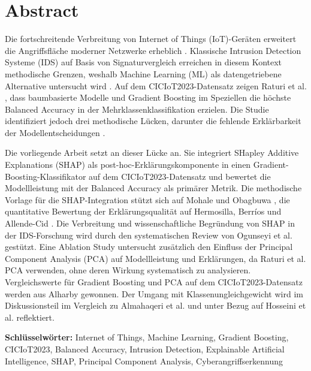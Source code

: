 \section*{Abstract}\label{abstract}

Die fortschreitende Verbreitung von Internet of Things (IoT)-Geräten erweitert die Angriffsfläche moderner Netzwerke erheblich \cite{hamedani2025iotsurvey}. Klassische Intrusion Detection Systeme (IDS) auf Basis von Signaturvergleich erreichen in diesem Kontext methodische Grenzen, weshalb Machine Learning (ML) als datengetriebene Alternative untersucht wird \cite{kikissagbe2024review}. Auf dem CICIoT2023-Datensatz \cite{neto2023ciciot2023} zeigen Raturi et al. \cite{raturi2026exploratory}, dass baumbasierte Modelle und Gradient Boosting im Speziellen die höchste Balanced Accuracy in der Mehrklassenklassifikation erzielen. Die Studie identifiziert jedoch drei methodische Lücken, darunter die fehlende Erklärbarkeit der Modellentscheidungen \cite{raturi2026exploratory}.

Die vorliegende Arbeit setzt an dieser Lücke an. Sie integriert SHapley Additive Explanations (SHAP) als post-hoc-Erklärungskomponente in einen Gradient-Boosting-Klassifikator auf dem CICIoT2023-Datensatz und bewertet die Modellleistung mit der Balanced Accuracy als primärer Metrik. Die methodische Vorlage für die SHAP-Integration stützt sich auf Mohale und Obagbuwa \cite{mohale2025xai}, die quantitative Bewertung der Erklärungsqualität auf Hermosilla, Berríos und Allende-Cid \cite{hermosilla2025xai_forensic}. Die Verbreitung und wissenschaftliche Begründung von SHAP in der IDS-Forschung wird durch den systematischen Review von Ogunseyi et al. \cite{ogunseyi2026xai_review} gestützt. Eine Ablation Study untersucht zusätzlich den Einfluss der Principal Component Analysis (PCA) auf Modellleistung und Erklärungen, da Raturi et al. \cite{raturi2026exploratory} PCA verwenden, ohne deren Wirkung systematisch zu analysieren. Vergleichswerte für Gradient Boosting und PCA auf dem CICIoT2023-Datensatz werden aus Alharby \cite{alharby2025ciciot} gewonnen. Der Umgang mit Klassenungleichgewicht wird im Diskussionsteil im Vergleich zu Almahaqeri et al. \cite{almahaqeri2026gradient} und unter Bezug auf Hosseini et al. \cite{hosseini2025imbalance} reflektiert.

\textbf{Schlüsselwörter:} Internet of Things, Machine Learning, Gradient Boosting, CICIoT2023, Balanced Accuracy, Intrusion Detection, Explainable Artificial Intelligence, SHAP, Principal Component Analysis, Cyberangriffserkennung
